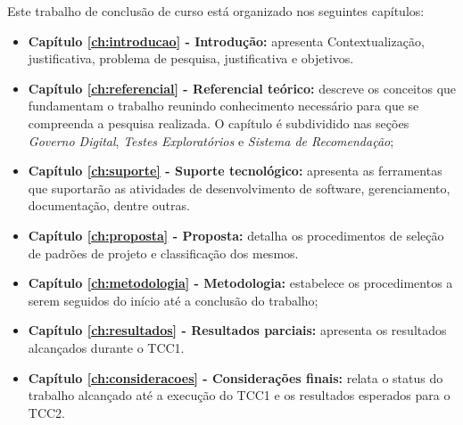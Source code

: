 Este trabalho de conclusão de curso está organizado nos seguintes capítulos:

\begin{itemize}
    \item \textbf{Capítulo \ref{ch:introducao} - Introdução:} apresenta Contextualização, justificativa, problema de pesquisa, justificativa e objetivos.
    \item \textbf{Capítulo \ref{ch:referencial} - Referencial teórico:} descreve os conceitos que fundamentam o trabalho reunindo conhecimento necessário para que se compreenda a pesquisa realizada. O capítulo é subdividido nas seções \textit{Governo Digital}, \textit{Testes Exploratórios} e \textit{Sistema de Recomendação};
    \item \textbf{Capítulo \ref{ch:suporte} - Suporte tecnológico:} apresenta as ferramentas que suportarão as atividades de desenvolvimento de software, gerenciamento, documentação, dentre outras.
    \item \textbf{Capítulo \ref{ch:proposta} - Proposta:} detalha os procedimentos de seleção de padrões de projeto e classificação dos mesmos.
    \item \textbf{Capítulo \ref{ch:metodologia} - Metodologia:} estabelece os procedimentos a serem seguidos do início até a conclusão do trabalho;
    \item \textbf{Capítulo \ref{ch:resultados} - Resultados parciais:} apresenta os resultados alcançados durante o TCC1.
    \item \textbf{Capítulo \ref{ch:consideracoes} - Considerações finais:} relata o status do trabalho alcançado até a execução do TCC1 e os resultados esperados para o TCC2.
\end{itemize}
